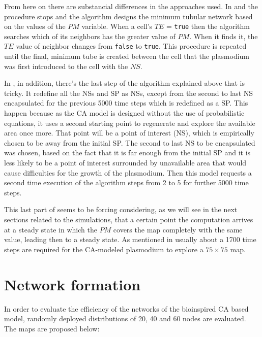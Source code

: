 \par
From here on there are substancial differences in the approaches used. In \cite{dourvas2016gpgpu} and \cite{tsompanas2015cellular} the procedure stops and the algorithm designs the minimum tubular network based on the values of the $PM$ variable. When a cell’s $TE$ = \texttt{true} then the algorithm searches which of its neighbors has the greater value of $PM$. When it finds it, the $TE$ value of neighbor changes from \texttt{false} to \texttt{true}. This procedure is repeated until the final, minimum tube is created between the cell that the plasmodium was first introduced to the cell with the $NS$. 

\par
In \cite{Tsompanas2016}, in addition, there's the last step of the algorithm explained above that is tricky. It redefine all the NSs and SP as NSs, except from the second to last NS encapsulated for the previous 5000 time steps which is redefined as a SP. This happen because as the CA model is designed without the use of probabilistic equations, it uses a second starting point to regenerate and explore the available area once more. That point will be a point of interest (NS), which is empirically chosen to be away from the initial SP. The second to last NS to be encapsulated was chosen, based on the fact that it is far enough from the initial SP and it is less likely to be a point of interest surrounded by unavailable area that would cause difficulties for the growth of the plasmodium. Then this model requests a second time execution of the algorithm steps from 2 to 5 for further 5000 time steps.

\par
This last part of seems to be forcing considering, as we will see in the next sections related to the simulations, that a certain point the computation arrives at a steady state in which the $PM$ covers the map completely with the same value, leading then to a steady state. As mentioned in \cite{dourvas2016gpgpu} usually about a 1700 time steps are required for the CA-modeled plasmodium to explore a $75 \times 75$ map.

\section{Network formation}
In order to evaluate the efficiency of the networks of the bioinspired CA based model, randomly deployed distributions of 20, 40 and 60 nodes are evaluated. The maps are proposed below:

